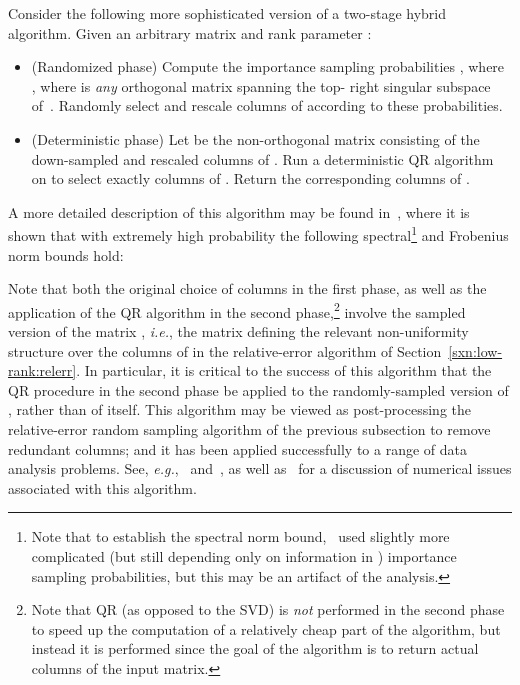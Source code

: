 \documentclass[twoside]{article}
\begin{document}
Consider the following more sophisticated version of a two-stage hybrid 
algorithm.
Given an arbitrary  matrix  and rank parameter :
\begin{itemize}
\item
(Randomized phase)
Compute the importance sampling probabilities , where 
, where  is \emph{any} 
 orthogonal matrix spanning the top- right singular subspace 
of~.
Randomly select and rescale  columns of  according 
to these probabilities.
\item
(Deterministic phase)
Let  be the  non-orthogonal matrix 
consisting of the down-sampled and rescaled columns of .
Run a deterministic QR algorithm on  to select exactly  
columns of .
Return the corresponding columns of .
\end{itemize}
A more detailed description of this algorithm may be found 
in~\cite{BMD09_CSSP_SODA,BMD08_CSSP_TRv2}, where it is shown that with 
extremely high probability the following spectral\footnote{Note that to establish the spectral norm 
bound,~\cite{BMD09_CSSP_SODA,BMD08_CSSP_TRv2} used slightly more complicated 
(but still depending only on information in ) importance sampling 
probabilities, but this may be an artifact of the analysis.}
and Frobenius norm bounds hold:

Note that both the original choice of columns in the first phase, as well 
as the application of the QR algorithm in the second phase,\footnote{Note that QR (as opposed to the SVD) is \emph{not} performed in 
the second phase to speed up the computation of a relatively cheap part of 
the algorithm, but instead it is performed since the goal of the algorithm 
is to return actual columns of the input matrix.}
involve the sampled version of the matrix , \emph{i.e.}, the matrix defining the relevant 
non-uniformity structure over the columns of  in the relative-error 
algorithm of Section~\ref{sxn:low-rank:relerr}.
In particular, it is critical to the success of this algorithm that the QR 
procedure in the second phase be applied to the randomly-sampled version 
of , rather than of  itself.
This algorithm may be viewed as post-processing the relative-error 
random sampling algorithm of the previous subsection to remove redundant 
columns; and it has been applied successfully to a range of data analysis 
problems.  See, \emph{e.g.},~\cite{Paschou08a,Paschou10a,Paschou10b}
and~\cite{BMD08_CSSP_KDD,BMD09_kmeans_NIPS,SD11}, as well as~\cite{BBP10}
for a discussion of numerical issues associated with this algorithm.
\end{document}

